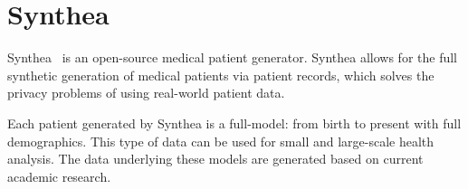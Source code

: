 \section{Synthea}

Synthea~\cite{hid-sp18-www-526-synthea} is an open-source
medical patient generator. Synthea allows for the full synthetic
generation of medical patients via patient records, which solves
the privacy problems of using real-world patient data.

Each patient generated by Synthea is a full-model: from birth
to present with full demographics. This type of data can be used
for small and large-scale health analysis. The data underlying
these models are generated based on current academic research.
